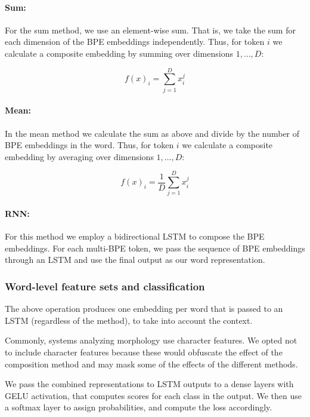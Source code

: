 \documentclass[11pt]{article}
\begin{document}
    	\paragraph{Sum:} For the sum method, we use an element-wise
     sum. That is, we take the sum for each dimension of the BPE
     embeddings independently. Thus, for token $i$ we calculate a
     composite embedding by summing over dimensions $1,\ldots,D$:
	
	\begin{equation}
	f(x)_i = \sum_{j=1}^{D} x_i^j
	\end{equation}
	

     \paragraph{Mean:} In the mean method we calculate the sum as above and
     divide by the number of BPE embeddings in the word. Thus, for
     token $i$ we calculate a composite embedding by averaging over
     dimensions $1,\ldots,D$:
	
	\begin{equation}
	f(x)_{i} = \frac{1}{D}\sum_{j=1}^{D} x_i^j
	\end{equation}
	
	
     \paragraph{RNN:} For this method we employ a bidirectional
     LSTM to compose the BPE embeddings. For each multi-BPE token, we
     pass the sequence of BPE embeddings through an LSTM and use the
     final output as our word representation.

     \subsubsection{Word-level feature sets and classification}
     The above operation produces one embedding per word that is passed
     to an LSTM (regardless of the method), to take into account the
     context.

            Commonly, systems analyzing morphology use character
     features. We opted not to include character features because
     these would obfuscate the effect of the composition method and
     may mask some of the effects of the different methods.

            We pass the combined representations to LSTM outputs to a
     dense layers with GELU activation, that computes scores for each
     class in the output. We then use a softmax layer to assign
     probabilities, and compute the loss accordingly.
\end{document}
